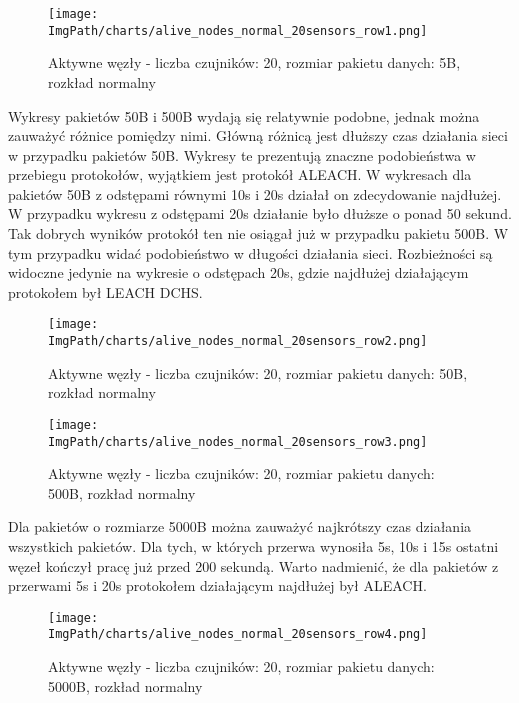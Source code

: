 \begin{figure}[H]
	\begin{center}
		\texttt{[image: \\ImgPath/charts/alive\_nodes\_normal\_20sensors\_row1.png]}
	\end{center}
	\caption{Aktywne węzły - liczba czujników: 20, rozmiar pakietu danych: 5B, rozkład normalny}
\end{figure}

Wykresy pakietów 50B i 500B wydają się relatywnie podobne, jednak można zauważyć różnice pomiędzy nimi. Główną różnicą jest dłuższy czas działania sieci w przypadku pakietów 50B. Wykresy te prezentują znaczne podobieństwa w przebiegu protokołów, wyjątkiem jest protokół ALEACH. W wykresach dla pakietów 50B z odstępami równymi 10s i 20s działał on zdecydowanie najdłużej. W przypadku wykresu z odstępami 20s działanie było dłuższe o ponad 50 sekund. Tak dobrych wyników protokół ten nie osiągał już w przypadku pakietu 500B. W tym przypadku widać podobieństwo w długości działania sieci. Rozbieżności są widoczne jedynie na wykresie o odstępach 20s, gdzie najdłużej działającym protokołem był LEACH DCHS. 

\begin{figure}[H]
	\begin{center}
		\texttt{[image: \\ImgPath/charts/alive\_nodes\_normal\_20sensors\_row2.png]}
	\end{center}
	\caption{Aktywne węzły - liczba czujników: 20, rozmiar pakietu danych: 50B, rozkład normalny}
\end{figure}

\begin{figure}[H]
	\begin{center}
		\texttt{[image: \\ImgPath/charts/alive\_nodes\_normal\_20sensors\_row3.png]}
	\end{center}
	\caption{Aktywne węzły - liczba czujników: 20, rozmiar pakietu danych: 500B, rozkład normalny}
\end{figure}

Dla pakietów o rozmiarze 5000B można zauważyć najkrótszy czas działania wszystkich pakietów. Dla tych, w których przerwa wynosiła 5s, 10s i 15s ostatni węzeł kończył pracę już przed 200 sekundą. Warto nadmienić, że dla pakietów z przerwami 5s i 20s protokołem działającym najdłużej był ALEACH. 

\begin{figure}[H]
	\begin{center}
		\texttt{[image: \\ImgPath/charts/alive\_nodes\_normal\_20sensors\_row4.png]}
	\end{center}
	\caption{Aktywne węzły - liczba czujników: 20, rozmiar pakietu danych: 5000B, rozkład normalny}
\end{figure}
 

